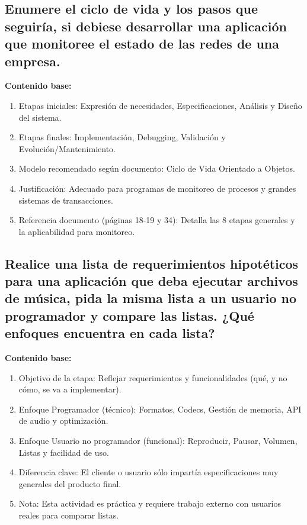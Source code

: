 \documentclass{article}
\begin{document}
\subsection{Enumere el ciclo de vida y los pasos que seguiría, si debiese desarrollar una aplicación que monitoree el estado de las redes de una empresa.}

\begin{framed}
\noindent\textbf{Contenido base:}
\begin{enumerate}
    \item Etapas iniciales: Expresión de necesidades, Especificaciones, Análisis y Diseño del sistema.
    \item Etapas finales: Implementación, Debugging, Validación y Evolución/Mantenimiento.
    \item Modelo recomendado según documento: Ciclo de Vida Orientado a Objetos.
    \item Justificación: Adecuado para programas de monitoreo de procesos y grandes sistemas de transacciones.
    \item Referencia documento (páginas 18-19 y 34): Detalla las 8 etapas generales y la aplicabilidad para monitoreo.
\end{enumerate}
\end{framed}

\subsection{Realice una lista de requerimientos hipotéticos para una aplicación que deba ejecutar archivos de música, pida la misma lista a un usuario no programador y compare las listas. ¿Qué enfoques encuentra en cada lista?}

\begin{framed}
\noindent\textbf{Contenido base:}
\begin{enumerate}
    \item Objetivo de la etapa: Reflejar requerimientos y funcionalidades (qué, y no cómo, se va a implementar).
    \item Enfoque Programador (técnico): Formatos, Codecs, Gestión de memoria, API de audio y optimización.
    \item Enfoque Usuario no programador (funcional): Reproducir, Pausar, Volumen, Listas y facilidad de uso.
    \item Diferencia clave: El cliente o usuario sólo impartía especificaciones muy generales del producto final.
    \item Nota: Esta actividad es práctica y requiere trabajo externo con usuarios reales para comparar listas.
\end{enumerate}
\end{framed}
\end{document}
